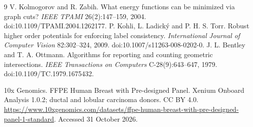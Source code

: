 \begin{thebibliography}{9}
 V. Kolmogorov and R. Zabih. What energy functions can be minimized via graph cuts? \emph{IEEE TPAMI} 26(2):147--159, 2004. doi:10.1109/TPAMI.2004.1262177.
 P. Kohli, L. Ladick\'y and P. H. S. Torr. Robust higher order potentials for enforcing label consistency. \emph{International Journal of Computer Vision} 82:302--324, 2009. doi:10.1007/s11263-008-0202-0.
 J. L. Bentley and T. A. Ottmann. Algorithms for reporting and counting geometric intersections. \emph{IEEE Transactions on Computers} C-28(9):643--647, 1979. doi:10.1109/TC.1979.1675432.

 10x Genomics. FFPE Human Breast with Pre-designed Panel. Xenium Onboard Analysis 1.0.2; ductal and lobular carcinoma donors. CC BY 4.0. \url{https://www.10xgenomics.com/datasets/ffpe-human-breast-with-pre-designed-panel-1-standard}. Accessed 31 October 2026.
\end{thebibliography}
